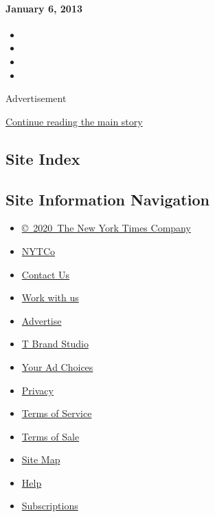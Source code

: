 \hypertarget{january-6-2013}{%
\paragraph{January 6, 2013}\label{january-6-2013}}

\begin{itemize}
\item
\item
\item
\item
\end{itemize}

Advertisement

\protect\hyperlink{after-bottom}{Continue reading the main story}

\hypertarget{site-index}{%
\subsection{Site Index}\label{site-index}}

\hypertarget{site-information-navigation}{%
\subsection{Site Information
Navigation}\label{site-information-navigation}}

\begin{itemize}
\tightlist
\item
  \href{https://help.nytimes3xbfgragh.onion/hc/en-us/articles/115014792127-Copyright-notice}{©~2020~The
  New York Times Company}
\end{itemize}

\begin{itemize}
\tightlist
\item
  \href{https://www.nytco.com/}{NYTCo}
\item
  \href{https://help.nytimes3xbfgragh.onion/hc/en-us/articles/115015385887-Contact-Us}{Contact
  Us}
\item
  \href{https://www.nytco.com/careers/}{Work with us}
\item
  \href{https://nytmediakit.com/}{Advertise}
\item
  \href{http://www.tbrandstudio.com/}{T Brand Studio}
\item
  \href{https://www.nytimes3xbfgragh.onion/privacy/cookie-policy\#how-do-i-manage-trackers}{Your
  Ad Choices}
\item
  \href{https://www.nytimes3xbfgragh.onion/privacy}{Privacy}
\item
  \href{https://help.nytimes3xbfgragh.onion/hc/en-us/articles/115014893428-Terms-of-service}{Terms
  of Service}
\item
  \href{https://help.nytimes3xbfgragh.onion/hc/en-us/articles/115014893968-Terms-of-sale}{Terms
  of Sale}
\item
  \href{https://spiderbites.nytimes3xbfgragh.onion}{Site Map}
\item
  \href{https://help.nytimes3xbfgragh.onion/hc/en-us}{Help}
\item
  \href{https://www.nytimes3xbfgragh.onion/subscription?campaignId=37WXW}{Subscriptions}
\end{itemize}
